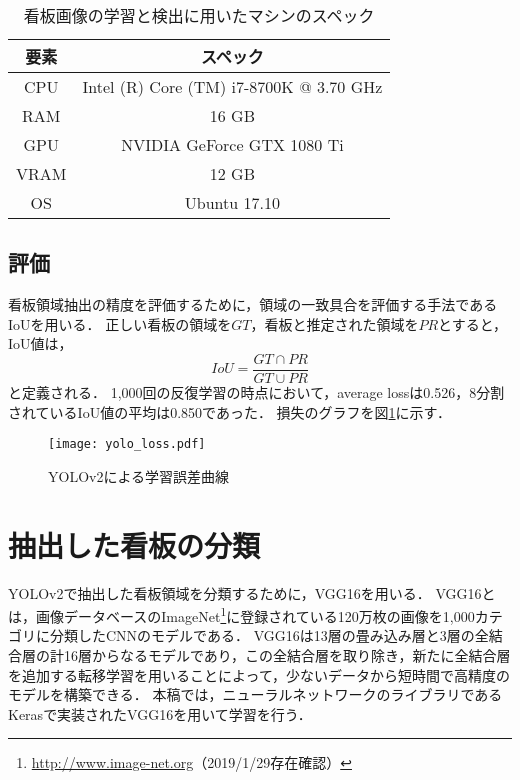     \begin{table}[tb]
      \caption{看板画像の学習と検出に用いたマシンのスペック}
      \label{table:machine}
      \begin{center}
        \begin{tabular}{c|c}
          \hline\hline
          \textbf{要素} & \textbf{スペック} \\
          \hline
          CPU & Intel (R) Core (TM) i7-8700K @ 3.70 GHz \\
          RAM & 16 GB \\
          GPU & NVIDIA GeForce GTX 1080 Ti \\
          VRAM & 12 GB \\
          OS & Ubuntu 17.10 \\
          \hline
        \end{tabular}
      \end{center}
    \end{table}

  \subsection{評価}
    看板領域抽出の精度を評価するために，領域の一致具合を評価する手法であるIoUを用いる．
    正しい看板の領域を$GT$，看板と推定された領域を$PR$とすると，IoU値は，
    \begin{equation}
      IoU = \frac{GT \cap PR}{GT \cup PR}
    \end{equation}
    と定義される．
    1,000回の反復学習の時点において，average lossは0.526，8分割されているIoU値の平均は0.850であった．
    損失のグラフを図\ref{figure:yolo_loss}に示す．

    \begin{figure}[tb]
      \centerline{\texttt{[image: yolo\_loss.pdf]}}
      \caption{YOLOv2による学習誤差曲線}
      \label{figure:yolo_loss}
    \end{figure}

\section{抽出した看板の分類}
  YOLOv2で抽出した看板領域を分類するために，VGG16を用いる．
  VGG16とは，画像データベースのImageNet\footnote{\url{http://www.image-net.org}（2019/1/29存在確認）}に登録されている120万枚の画像を1,000カテゴリに分類したCNNのモデルである．
  VGG16は13層の畳み込み層と3層の全結合層の計16層からなるモデルであり，この全結合層を取り除き，新たに全結合層を追加する転移学習を用いることによって，少ないデータから短時間で高精度のモデルを構築できる．
  本稿では，ニューラルネットワークのライブラリであるKeras\cite{Chollet:2015}で実装されたVGG16を用いて学習を行う．

